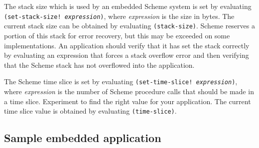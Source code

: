 \documentclass[12pt]{article}
\begin{document}
The stack size which is used by an embedded Scheme system is set by
evaluating \texttt{(set-stack-size!\ \textnormal{\emph{expression}})},
where \emph{expression} is the size in bytes.  The current stack size
can be obtained by evaluating \texttt{(stack-size)}.  Scheme reserves
a portion of this stack for error recovery, but this may be exceeded
on some implementations.  An application should verify that it has set
the stack correctly by evaluating an expression that forces a stack
overflow error and then verifying that the Scheme stack has not
overflowed into the application.

The Scheme time slice is set by evaluating \texttt{(set-time-slice!\
\textnormal{\emph{expression}})}, where \emph{expression} is the number of Scheme
procedure calls that should be made in a time slice.  Experiment to
find the right value for your application. The current time slice
value is obtained by evaluating \texttt{(time-slice)}.

\subsection*{Sample embedded application}
\end{document}
